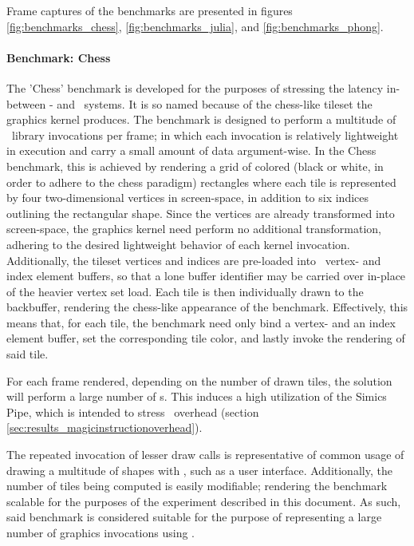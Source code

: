 Frame captures of the benchmarks are presented in figures \ref{fig:benchmarks_chess}, \ref{fig:benchmarks_julia}, and \ref{fig:benchmarks_phong}.




\paragraph{Benchmark: Chess}
\label{par:methodologyexperiment_benchmarking_benchmarkchess}
The 'Chess' benchmark is developed for the purposes of stressing the latency in-between \dvttermtarget - and \dvttermhost\ systems.
It is so named because of the chess-like tileset the graphics kernel produces.
The benchmark is designed to perform a multitude of \dvttermopenglestwopointo\ library invocations per frame; in which each invocation is relatively lightweight in execution and carry a small amount of data argument-wise.
In the Chess benchmark, this is achieved by rendering a grid of colored (black or white, in order to adhere to the chess paradigm) rectangles where each tile is represented by four two-dimensional vertices in screen-space, in addition to six indices outlining the rectangular shape.
Since the vertices are already transformed into screen-space, the graphics kernel need perform no additional transformation, adhering to the desired lightweight behavior of each kernel invocation.
Additionally, the tileset vertices and indices are pre-loaded into \dvttermopengl\ vertex- and index element buffers, so that a lone buffer identifier may be carried over in-place of the heavier vertex set load.
Each tile is then individually drawn to the backbuffer, rendering the chess-like appearance of the benchmark.
Effectively, this means that, for each tile, the benchmark need only bind a vertex- and an index element buffer, set the corresponding tile color, and lastly invoke the rendering of said tile.

For each frame rendered, depending on the number of drawn tiles, the solution will perform a large number of \dvttermmagicinstruction s.
This induces a high utilization of the Simics Pipe, which is intended to stress \dvttermmagicinstruction\ overhead (section \ref{sec:results_magicinstructionoverhead}).

The repeated invocation of lesser draw calls is representative of common usage of drawing a multitude of shapes with \dvttermopengl , such as a user interface. Additionally, the number of tiles being computed is easily modifiable; rendering the benchmark scalable for the purposes of the experiment described in this document. As such, said benchmark is considered suitable for the purpose of representing a large number of graphics invocations using \dvttermopenglestwopointo .

